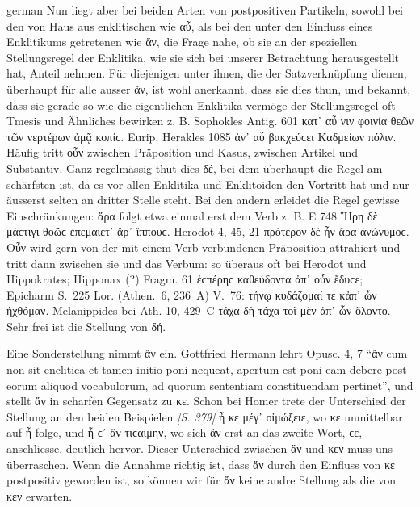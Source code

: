 \begin{otherlanguage*}{german}
Nun liegt aber bei beiden Arten von postpositiven Partikeln, sowohl bei den von Haus aus enklitischen wie αὖ, als bei den unter den Einfluss eines Enklitikums getretenen wie ἄν, die Frage nahe, ob sie an der speziellen Stellungsregel der Enklitika, wie sie sich bei unserer Betrachtung herausgestellt hat, Anteil nehmen. Für diejenigen unter ihnen, die der Satzverknüpfung dienen, überhaupt für alle ausser ἄν, ist wohl anerkannt, dass sie dies thun, und bekannt, dass sie gerade so wie die eigentlichen Enklitika vermöge der Stellungsregel oft Tmesis und Ähnliches bewirken z. B. Sophokles Antig. 601 κατ᾽ αὖ νιν φοινία θεῶν τῶν νερτέρων ἀμᾷ κοπίϲ. Eurip. Herakles 1085 ἀν᾽ αὖ βακχεύϲει Καδμείων πόλιν. Häufig tritt οὖν zwischen Präposition und Kasus, zwischen Artikel und Substantiv. Ganz regelmässig thut dies δέ, bei dem überhaupt die Regel am schärfsten ist, da es vor allen Enklitika und Enklitoiden den Vortritt hat und nur äusserst selten an dritter Stelle steht. Bei den andern erleidet die Regel gewisse Einschränkungen: ἄρα folgt etwa einmal erst dem Verb z. B. Ε 748 Ἥρη δὲ μάϲτιγι θοῶϲ ἐπεμαίετ᾽ ἄρ᾽ ἵππουϲ. Herodot 4, 45, 21 πρότερον δὲ ἦν ἄρα ἀνώνυμοϲ. Οὖν wird gern von der mit einem Verb verbundenen Präposition attrahiert und tritt dann zwischen sie und das Verbum: so überaus oft bei Herodot und Hippokrates; Hipponax (?) Fragm. 61 ἑϲπέρηϲ καθεύδοντα ἀπ᾽ οὖν ἔδυϲε; Epicharm S.~225 Lor. (Athen.~6, 236~A) V.~76: τήνῳ κυδάζομαί τε κἀπ᾽ ὦν ἠχθόμαν. Melanippides bei Ath. 10, 429~C τάχα δὴ τάχα τοὶ μὲν ἀπ᾽ ὦν ὄλοντο. Sehr frei ist die Stellung von δή.

Eine Sonderstellung nimmt ἄν ein. Gottfried Hermann lehrt Opusc. 4, 7 “ἄν cum non sit enclitica et tamen initio poni nequeat, apertum est poni eam debere post eorum aliquod vocabulorum, ad quorum sententiam constituendam pertinet”, und stellt ἄν in scharfen Gegensatz zu κε. Schon bei Homer trete der Unterschied der Stellung an den beiden Beispielen \hypertarget{p379}{\emph{[S. 379]}}\label{p379} ἦ κε μέγ᾽ οἰμώξειε, wo κε unmittelbar auf ἦ folge, und ἦ ϲ᾽ ἂν τιϲαίμην, wo sich ἄν erst an das zweite Wort, ϲε, anschliesse, deutlich hervor. Dieser Unterschied zwischen ἄν und κεν muss uns überraschen. Wenn die Annahme richtig ist, dass ἄν durch den Einfluss von κε postpositiv geworden ist, so können wir für ἄν keine andre Stellung als die von κεν erwarten.


\end{otherlanguage*}
